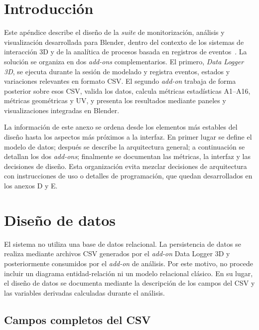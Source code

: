 \label{apendice:especificacion_diseno}

\section{Introducción}
\label{sec:c-introduccion}

Este apéndice describe el diseño de la \textit{suite} de monitorización, análisis y visualización desarrollada para Blender, dentro del contexto de los sistemas de interacción 3D y de la analítica de procesos basada en registros de eventos~\cite{bowman2004,vanderalst2016process}. La solución se organiza en dos \textit{add-ons} complementarios. El primero, \textit{Data Logger 3D}, se ejecuta durante la sesión de modelado y registra eventos, estados y variaciones relevantes en formato CSV. El segundo \textit{add-on} trabaja de forma posterior sobre esos CSV, valida los datos, calcula métricas estadísticas A1--A16, métricas geométricas y UV, y presenta los resultados mediante paneles y visualizaciones integradas en Blender.

La información de este anexo se ordena desde los elementos más estables del diseño hasta los aspectos más próximos a la interfaz. En primer lugar se define el modelo de datos; después se describe la arquitectura general; a continuación se detallan los dos \textit{add-ons}; finalmente se documentan las métricas, la interfaz y las decisiones de diseño. Esta organización evita mezclar decisiones de arquitectura con instrucciones de uso o detalles de programación, que quedan desarrollados en los anexos D y E.

\section{Diseño de datos}
\label{sec:c-diseno-datos}

El sistema no utiliza una base de datos relacional. La persistencia de datos se realiza mediante archivos CSV generados por el \textit{add-on} Data Logger 3D y posteriormente consumidos por el \textit{add-on} de análisis. Por este motivo, no procede incluir un diagrama entidad-relación ni un modelo relacional clásico. En su lugar, el diseño de datos se documenta mediante la descripción de los campos del CSV y las variables derivadas calculadas durante el análisis.

\subsection{Campos completos del CSV}
\label{subsec:c-campos-csv}

